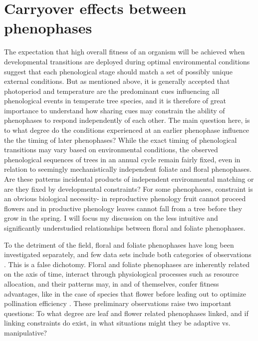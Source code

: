 \documentclass{article}\usepackage[]{graphicx}\usepackage[]{color}
\begin{document}
\section{Carryover effects between phenophases}
\par The expectation that high overall fitness of an organism will be achieved when developmental transitions are deployed during optimal environmental conditions suggest that each phenological stage should match a set of possibly unique external conditions. But as mentioned above, it is generally accepted that photoperiod and temperature are the predominant cues influencing all phenological events in temperate tree species, and it is therefore of great importance to understand how sharing cues may constrain the ability of phenophases to respond independently of each other. The main question here, is to what degree do the conditions experienced at an earlier phenophase influence the the timing of later phenophases? While the exact timing of phenological transitions may vary based on environmental conditions, the observed phenological sequences of trees in an annual cycle remain fairly fixed, even in relation to seemingly mechanistically independent foliate and floral phenophases. Are these patterns incidental products of independent environmental matching or are they fixed by developmental constraints? For some phenophases, constraint is an obvious biological necessity- in reproductive phenology fruit cannot proceed flowers and in productive phenology leaves cannot fall from a tree before they grow in the spring. I will focus my discussion on the less intuitive and significantly understudied relationships between floral and foliate phenophases.
\par To the detriment of the field, floral and foliate phenophases have long been investigated separately, and few data sets include both categories of observations \citep{Wolkovich2014}. This is a false dichotomy. Floral and foliate phenophases are inherently related on the axis of time, interact through physiological processes such as resource allocation, and their patterns may, in and of themselves, confer fitness advantages, like in the case of species that flower before leafing out to optimize pollination efficiency \citep{Whitehead1969}. These preliminary observations raise two important questions: To what degree are leaf and flower related phenophases linked, and if linking constraints do exist, in what situations might they be adaptive vs. manipulative?
\end{document}
